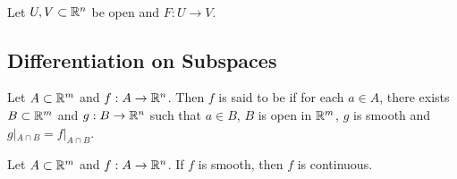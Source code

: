 \documentclass{book}
\begin{document}
	\begin{ex}  \\
	Let $U,V \subset \mathbb{R}^n$ be open and $F: U \rightarrow V$.
	\end{ex}
	
	
	
	
	
	
	
	
	
	
	
	
	
	
	
	
	
	
	
	
	
	
	
	
	
	
	
	
	
	
	
	
	
	
	
	
	
	
	
	
	
	\newpage
	\subsection{Differentiation on Subspaces}
	
	\begin{defn} 
		Let $A \subset \mathbb{R}^m$ and $f: A \rightarrow \mathbb{R}^n$. Then $f$ is said to be  if for each $a \in A$, there exists $B \subset \mathbb{R}^m$ and $g:B \rightarrow \mathbb{R}^n$ such that $a \in B$, $B$ is open in $\mathbb{R}^m$, $g$ is smooth and $g|_{A \cap B} = f|_{A \cap B}$. 
	\end{defn}

	\begin{ex} 
		Let $A \subset \mathbb{R}^m$ and $f: A \rightarrow \mathbb{R}^n$. If $f$ is smooth, then $f$ is continuous.
	\end{ex}
\end{document}
